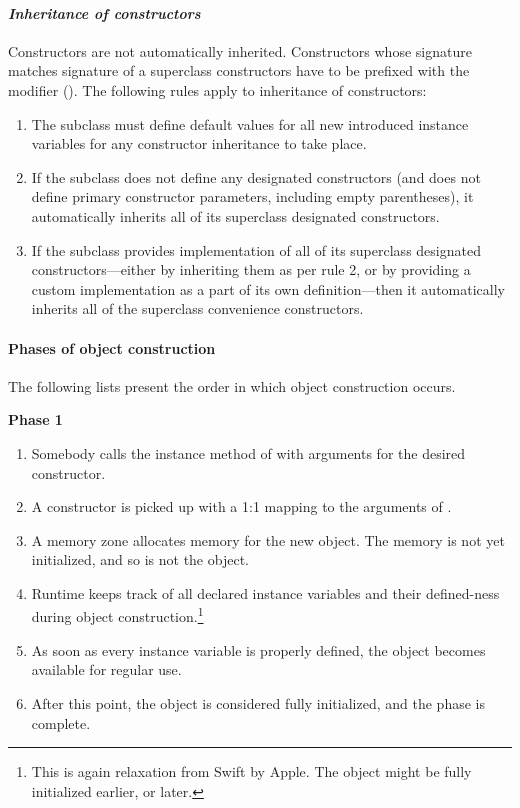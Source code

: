 \paragraph{\em Inheritance of constructors}
Constructors are not automatically inherited. Constructors whose signature matches signature of a superclass constructors have to be prefixed with the  modifier (). The following rules apply to inheritance of constructors:
\begin{enumerate}
  \item[Rule 1] The subclass must define default values for all new introduced instance variables for any constructor inheritance to take place. 
  \item[Rule 2] If the subclass does not define any designated constructors (and does not define primary constructor parameters, including empty parentheses), it automatically inherits all of its superclass designated constructors. 
  \item[Rule 3] If the subclass provides implementation of all of its superclass designated constructors---either by inheriting them as per rule 2, or by providing a custom implementation as a part of its own definition---then it automatically inherits all of the superclass convenience constructors. 
\end{enumerate}

\paragraph{Phases of object construction}
The following lists present the order in which object construction occurs.

{\bfseries Phase 1}
\begin{enumerate}
  \item Somebody calls the  instance method of  with arguments for the desired constructor. 
  \item A constructor is picked up with a 1:1 mapping to the arguments of . 
  \item A memory zone allocates memory for the new object. The memory is not yet initialized, and so is not the object. 
  \item Runtime keeps track of all declared instance variables and their defined-ness during object construction.\footnote{This is again relaxation from Swift by Apple. The object might be fully initialized earlier, or later.} 
  \item As soon as every instance variable is properly defined, the  object becomes available for regular use. 
  \item After this point, the object is considered fully initialized, and the phase is complete. 
\end{enumerate}

